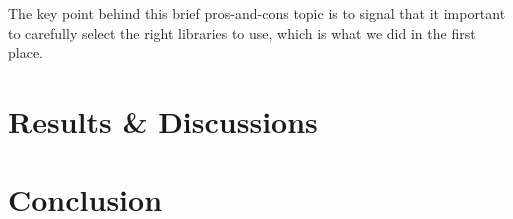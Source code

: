 \noindent
The key point behind this brief pros-and-cons topic is to signal that it important to carefully select the right libraries to use, which is what we did in the first place.

\section{Results \& Discussions}

\section{Conclusion}

